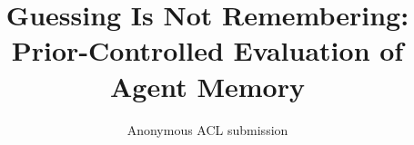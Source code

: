 \documentclass[11pt]{article}
\title{Guessing Is Not Remembering:\\Prior-Controlled Evaluation of Agent Memory}
\author{Anonymous ACL submission}
\begin{document}
\maketitle
\begin{abstract}

\end{abstract}












\appendix

\end{document}
